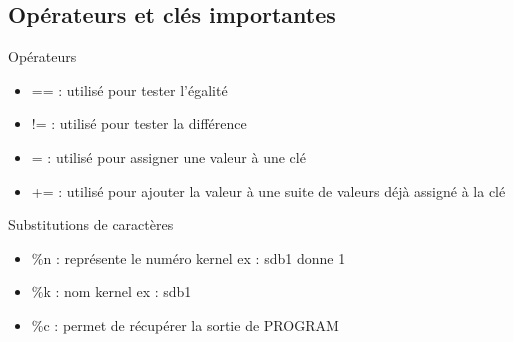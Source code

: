 \documentclass{beamer}
\begin{document}
\subsection{Opérateurs et clés importantes}

\begin{frame}
\begin{block}{Opérateurs} 
	
	\begin{itemize}
		
		[circle]
		\item == : utilisé pour tester l'égalité
		\item != : utilisé pour tester la différence
		\item = : utilisé pour assigner une valeur à une clé
		\item += : utilisé pour ajouter la valeur à une suite de valeurs déjà assigné à la clé
	\end{itemize}
\end{block}

\begin{block}{Substitutions de caractères} 
	
	\begin{itemize}
		
		[circle]
		\item \%n : représente le numéro kernel ex : sdb1 donne 1
		\item \%k : nom kernel ex : sdb1 
		\item \%c : permet de récupérer la sortie de PROGRAM
	\end{itemize}
\end{block}

\end{frame}
\end{document}
